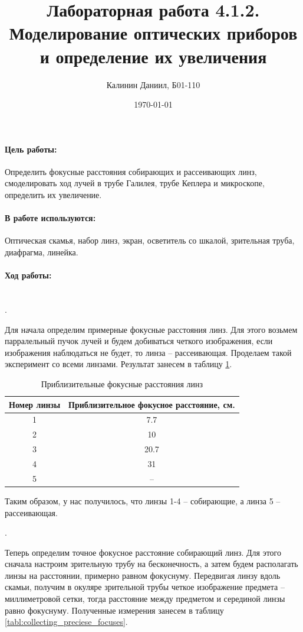 \documentclass[a4paper, 12pt]{article}
\author{Калинин Даниил, Б01-110}
\date{\today}
\title{Лабораторная работа 4.1.2. Моделирование оптических приборов и определение их увеличения}
\newcommand{\parag}[1]{\paragraph*{#1:}}
\newcounter{Points}
\newcommand{\point}{\arabic{Points}. \addtocounter{Points}{1}}
\begin{document}
\maketitle
\parindent=0cm

\parag {Цель работы}
Определить фокусные расстояния собирающих и рассеивающих линз, смоделировать ход лучей в трубе Галилея, трубе Кеплера и микроскопе, определить их увеличение.

\parag {В работе используются}
Оптическая скамья, набор линз, экран, осветитель со шкалой, зрительная труба, диафрагма, линейка.

\parag {Ход работы} ~\\
\point Для начала определим примерные фокусные расстояния линз. Для этого возьмем парралельный пучок лучей и будем добиваться четкого изображения, если изображения наблюдаться не будет, то линза -- рассеивающая. Проделаем такой эксперимент со всеми линзами. Результат занесем в таблицу  \ref{tabl:approx_focuses}.

\begin{table}[h]
    \centering
    \begin{tabular}{|c|c|}
    \hline 
        Номер линзы & Приблизительное фокусное расстояние, см. \\ \hline
        1 &  7.7      \\ \hline
        2 &  10       \\ \hline
        3 &  20.7     \\ \hline
        4 &  31       \\ \hline
        5 &  --       \\ \hline
        
    \end{tabular}
    \caption{Приблизительные фокусные расстояния линз}
    \label{tabl:approx_focuses}
\end{table}

Таким образом, у нас получилось, что линзы 1-4 -- собирающие, а линза 5 -- рассеивающая.

\point Теперь определим точное фокусное расстояние собирающий линз. Для этого сначала настроим зрительную трубу на бесконечность, а затем будем располагать линзы на расстоянии, примерно равном фокуснуму. Передвигая линзу вдоль скамьи, получим в окуляре зрительной трубы четкое изображение предмета -- миллиметровой сетки, тогда расстояние между предметом и серединой линзы равно фокуснуму. Полученные измерения занесем в таблицу \ref{tabl:collecting_preciese_focuses}. 
\end{document}
